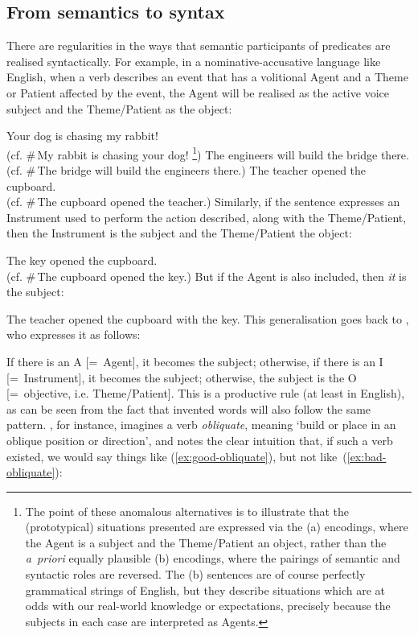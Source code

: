\documentclass[output=paper]{langscibook}
\begin{document}
\subsection{From semantics to syntax}
\label{sec:argstr:sem-to-syn}

There are regularities in the ways that semantic participants of predicates are
realised syntactically. %
For example, in a nominative-accusative language like English, when a verb
describes an event that has a volitional Agent and a Theme or Patient affected
by the event, the Agent will be realised as the active voice subject and the
Theme\slash Patient as the object:

\ea\label{ex:simple-transitives}
\ea Your dog is chasing my rabbit!\\(cf. \#\,My rabbit is chasing your dog!%
%
\footnote{The point of these anomalous alternatives is to illustrate that the
  (prototypical) situations presented are expressed via the (a) encodings, where
  the Agent is a subject and the Theme\slash Patient an object, rather than the
  \textit{a~priori} equally plausible (b) encodings, where the pairings of
  semantic and syntactic roles are reversed. The (b) sentences are of course
  perfectly grammatical strings of English, but they describe situations which
  are at odds with our real-world know\-ledge or expectations, precisely because
  the subjects in each case are interpreted as Agents.})
%
\ex The engineers will build the bridge there.\\(cf. \#\,The bridge will build
the engineers there.)%
\ex The teacher opened the cupboard.\\(cf. \#\,The cupboard opened the teacher.)%
\z
\z
%
Similarly, if the sentence expresses an Instrument used to perform the action
described, along with the Theme\slash Patient, then the Instrument is the subject and the
Theme\slash Patient the object:

\ea
\ea The key opened the cupboard.\\(cf. \#\,The cupboard opened the key.)
\z
\z
%
But if the Agent is also included, then \emph{it} is the subject:

\ea\label{ex:transitive-with-Instrument}
The teacher opened the cupboard with the key.
\z
%
This generalisation goes back to \citet[33]{fillmore:case}, who expresses it as
follows:

\ea\label{ex:fillmore-scale}
If there is an A [=~Agent], it becomes the subject; otherwise, if there is an I [=~Instrument],
it becomes the subject; otherwise, the subject is the O [=~objective, i.e. Theme\slash Patient].
\z
%
This is a productive rule (at least in English), as can be seen from the fact
that invented words will also follow the same pattern.
\citet[5--6]{alsina1996the-role}, for instance, imagines a verb
\textit{obliquate}, meaning `build or place in an oblique position or
direction', and notes the clear intuition that, if such a verb existed, we would
say things like (\ref{ex:good-obliquate}), but not
like~(\ref{ex:bad-obliquate}):
\end{document}
